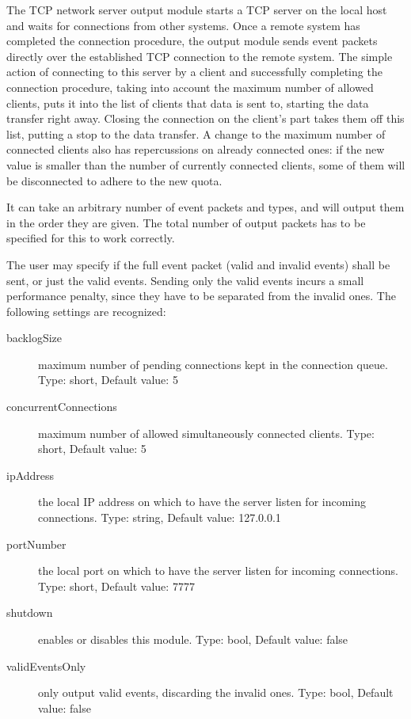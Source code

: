 \documentclass[a4paper,12pt]{report}
\begin{document}
The TCP network server output module starts a TCP server on the local host and waits for connections from other systems. Once a remote system has completed the connection procedure, the output module sends event packets directly over the established TCP connection to the remote system.
The simple action of connecting to this server by a client and successfully completing the connection procedure, taking into account the maximum number of allowed clients, puts it into the list of clients that data is sent to, starting the data transfer right away.
Closing the connection on the client's part takes them off this list, putting a stop to the data transfer.
A change to the maximum number of connected clients also has repercussions on already connected ones: if the new value is smaller than the number of currently connected clients, some of them will be disconnected to adhere to the new quota.

It can take an arbitrary number of event packets and types, and will output them in the order they are given. The total number of output packets has to be specified for this to work correctly.

The user may specify if the full event packet (valid and invalid events) shall be sent, or just the valid events. Sending only the valid events incurs a small performance penalty, since they have to be separated from the invalid ones.
\clearpage
The following settings are recognized:
\begin{description}
\item[backlogSize] maximum number of pending connections kept in the connection queue.
\subitem Type: short, Default value: 5
\item[concurrentConnections] maximum number of allowed simultaneously connected clients.
\subitem Type: short, Default value: 5
\item[ipAddress] the local IP address on which to have the server listen for incoming connections.
\subitem Type: string, Default value: 127.0.0.1
\item[portNumber] the local port on which to have the server listen for incoming connections.
\subitem Type: short, Default value: 7777
\item[shutdown] enables or disables this module.
\subitem Type: bool, Default value: false
\item[validEventsOnly] only output valid events, discarding the invalid ones.
\subitem Type: bool, Default value: false
\end{description}
\end{document}
